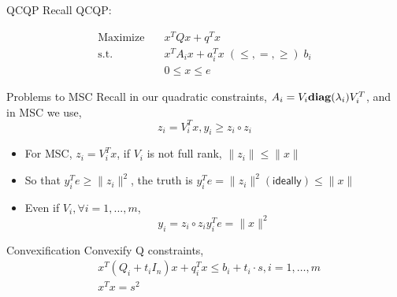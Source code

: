

\usepackage{subfig}
\usepackage[style=authoryear]{biblatex}
\usepackage{bm}

\date{\today}




\fontsize{9pt}{11}\selectfont
\frame{\titlepage}
\begin{frame}{QCQP}
  Recall QCQP:

  \begin{equation}
    \begin{aligned}
      \mathrm{Maximize}\quad & x^TQx + q^T x                                   \\
      \mathrm{s.t.}  \quad   & x^{T} A_i x  + a_i^Tx   \; (\le, =, \ge) \; b_i \\
                             & 0\le x\le e
    \end{aligned}
  \end{equation}
\end{frame}
\begin{frame}{Problems to MSC}
  Recall in our quadratic constraints, \(A_i = V_i \mathbf{diag} (\lambda_i) V_i^T\), and in MSC we use,\begin{equation}
    z_i = V_i^Tx, y_i \ge z_i \circ z_i
  \end{equation}
  \begin{itemize}
    \item For MSC, \(z_i = V_i^Tx\), if \(V_i\) is not full rank, \(\|z_i\| \le \|x\|\)
    \item So that \(y_i^Te \ge \|z_i\|^2\), the truth is \(y_i^Te = \|z_i\|^2 (\textsf{ideally}) \le \|x\|\)
    \item Even if \(V_i, \forall i = 1, ..., m\),
          \begin{equation}
            y_i = z_i \circ z_i y_i^Te = \|x\|^2
          \end{equation}
  \end{itemize}
\end{frame}
\begin{frame}{Convexification}
  Convexify Q constraints,
  \begin{equation}\label{eq:primal.Sigma}
    \begin{aligned}
       & x^T(Q_i+t_i I_n) x+q_i^T x \leqslant b_i+ t_i \cdot s,i= 1,\dots, m \\
       & x^T x= s^2
    \end{aligned}
  \end{equation}
\end{frame}

